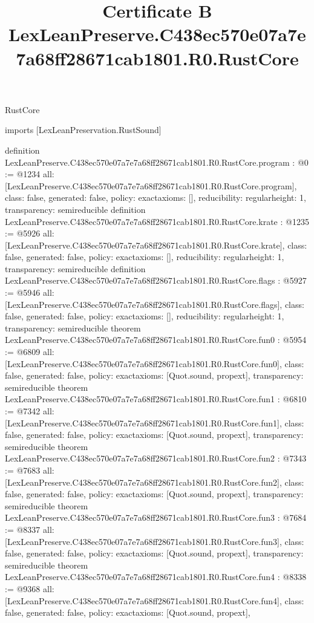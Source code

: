 \begin{lexlean}{RustCore}
\title{Certificate B LexLeanPreserve.C438ec570e07a7e7a68ff28671cab1801.R0.RustCore}
\begin{coremodule}
imports [LexLeanPreservation.RustSound]

definition LexLeanPreserve.C438ec570e07a7e7a68ff28671cab1801.R0.RustCore.program : @0 := @1234 {
  all: [LexLeanPreserve.C438ec570e07a7e7a68ff28671cab1801.R0.RustCore.program],
  class: false,
  generated: false,
  policy: exact{axioms: []},
  reducibility: regular{height: 1},
  transparency: semireducible
}
definition LexLeanPreserve.C438ec570e07a7e7a68ff28671cab1801.R0.RustCore.krate : @1235 := @5926 {
  all: [LexLeanPreserve.C438ec570e07a7e7a68ff28671cab1801.R0.RustCore.krate],
  class: false,
  generated: false,
  policy: exact{axioms: []},
  reducibility: regular{height: 1},
  transparency: semireducible
}
definition LexLeanPreserve.C438ec570e07a7e7a68ff28671cab1801.R0.RustCore.flags : @5927 := @5946 {
  all: [LexLeanPreserve.C438ec570e07a7e7a68ff28671cab1801.R0.RustCore.flags],
  class: false,
  generated: false,
  policy: exact{axioms: []},
  reducibility: regular{height: 1},
  transparency: semireducible
}
theorem LexLeanPreserve.C438ec570e07a7e7a68ff28671cab1801.R0.RustCore.fun0 : @5954 := @6809 {
  all: [LexLeanPreserve.C438ec570e07a7e7a68ff28671cab1801.R0.RustCore.fun0],
  class: false,
  generated: false,
  policy: exact{axioms: [Quot.sound, propext]},
  transparency: semireducible
}
theorem LexLeanPreserve.C438ec570e07a7e7a68ff28671cab1801.R0.RustCore.fun1 : @6810 := @7342 {
  all: [LexLeanPreserve.C438ec570e07a7e7a68ff28671cab1801.R0.RustCore.fun1],
  class: false,
  generated: false,
  policy: exact{axioms: [Quot.sound, propext]},
  transparency: semireducible
}
theorem LexLeanPreserve.C438ec570e07a7e7a68ff28671cab1801.R0.RustCore.fun2 : @7343 := @7683 {
  all: [LexLeanPreserve.C438ec570e07a7e7a68ff28671cab1801.R0.RustCore.fun2],
  class: false,
  generated: false,
  policy: exact{axioms: [Quot.sound, propext]},
  transparency: semireducible
}
theorem LexLeanPreserve.C438ec570e07a7e7a68ff28671cab1801.R0.RustCore.fun3 : @7684 := @8337 {
  all: [LexLeanPreserve.C438ec570e07a7e7a68ff28671cab1801.R0.RustCore.fun3],
  class: false,
  generated: false,
  policy: exact{axioms: [Quot.sound, propext]},
  transparency: semireducible
}
theorem LexLeanPreserve.C438ec570e07a7e7a68ff28671cab1801.R0.RustCore.fun4 : @8338 := @9368 {
  all: [LexLeanPreserve.C438ec570e07a7e7a68ff28671cab1801.R0.RustCore.fun4],
  class: false,
  generated: false,
  policy: exact{axioms: [Quot.sound, propext]},
}
\end{coremodule}
\end{lexlean}
